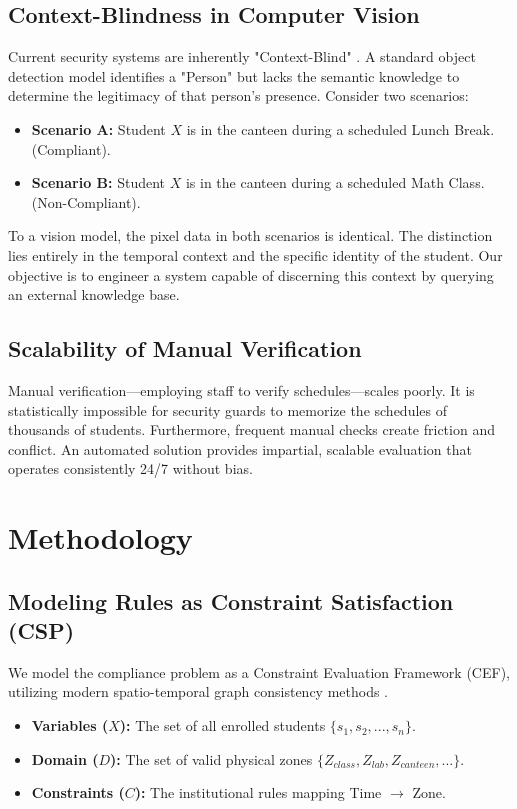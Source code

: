 \documentclass[conference]{IEEEtran}
\begin{document}
\subsection{Context-Blindness in Computer Vision}
Current security systems are inherently "Context-Blind" \cite{b5}. A standard object detection model identifies a "Person" but lacks the semantic knowledge to determine the legitimacy of that person's presence.
Consider two scenarios:
\begin{itemize}
    \item \textbf{Scenario A:} Student $X$ is in the canteen during a scheduled Lunch Break. (Compliant).
    \item \textbf{Scenario B:} Student $X$ is in the canteen during a scheduled Math Class. (Non-Compliant).
\end{itemize}
To a vision model, the pixel data in both scenarios is identical. The distinction lies entirely in the temporal context and the specific identity of the student. Our objective is to engineer a system capable of discerning this context by querying an external knowledge base.

\subsection{Scalability of Manual Verification}
Manual verification—employing staff to verify schedules—scales poorly. It is statistically impossible for security guards to memorize the schedules of thousands of students. Furthermore, frequent manual checks create friction and conflict. An automated solution provides impartial, scalable evaluation that operates consistently 24/7 without bias.

\section{Methodology}

\subsection{Modeling Rules as Constraint Satisfaction (CSP)}
We model the compliance problem as a Constraint Evaluation Framework (CEF), utilizing modern spatio-temporal graph consistency methods \cite{b12}. 
\begin{itemize}
    \item \textbf{Variables ($X$):} The set of all enrolled students $\{s_1, s_2, ..., s_n\}$.
    \item \textbf{Domain ($D$):} The set of valid physical zones $\{Z_{class}, Z_{lab}, Z_{canteen}, ...\}$.
    \item \textbf{Constraints ($C$):} The institutional rules mapping Time $\to$ Zone.
\end{itemize}
\end{document}

